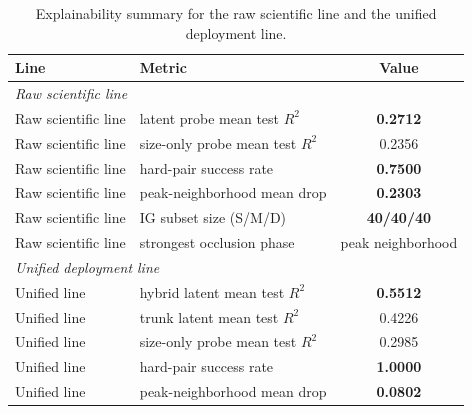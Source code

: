 ﻿\begin{table}[t]
\caption{Explainability summary for the raw scientific line and the unified deployment line.}
\label{tab:explainability}
\centering
\begin{tabular}{p{}p{}c}
\toprule
Line & Metric & Value \\
\midrule
\multicolumn{3}{l}{\textit{Raw scientific line}} \\
Raw scientific line & latent probe mean test $R^2$ & \textbf{0.2712} \\
Raw scientific line & size-only probe mean test $R^2$ & 0.2356 \\
Raw scientific line & hard-pair success rate & \textbf{0.7500} \\
Raw scientific line & peak-neighborhood mean drop & \textbf{0.2303} \\
Raw scientific line & IG subset size (S/M/D) & \textbf{40/40/40} \\
Raw scientific line & strongest occlusion phase & peak neighborhood \\
\midrule
\multicolumn{3}{l}{\textit{Unified deployment line}} \\
Unified line & hybrid latent mean test $R^2$ & \textbf{0.5512} \\
Unified line & trunk latent mean test $R^2$ & 0.4226 \\
Unified line & size-only probe mean test $R^2$ & 0.2985 \\
Unified line & hard-pair success rate & \textbf{1.0000} \\
Unified line & peak-neighborhood mean drop & \textbf{0.0802} \\
\bottomrule
\end{tabular}
\end{table}


